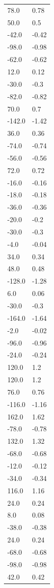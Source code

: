 \begin{longtable}{ll}
78.0 & 0.78 \\
50.0 & 0.5 \\
-42.0 & -0.42 \\
-98.0 & -0.98 \\
-62.0 & -0.62 \\
12.0 & 0.12 \\
-30.0 & -0.3 \\
-82.0 & -0.82 \\
70.0 & 0.7 \\
-142.0 & -1.42 \\
36.0 & 0.36 \\
-74.0 & -0.74 \\
-56.0 & -0.56 \\
72.0 & 0.72 \\
-16.0 & -0.16 \\
-18.0 & -0.18 \\
-36.0 & -0.36 \\
-20.0 & -0.2 \\
-30.0 & -0.3 \\
-4.0 & -0.04 \\
34.0 & 0.34 \\
48.0 & 0.48 \\
-128.0 & -1.28 \\
6.0 & 0.06 \\
-30.0 & -0.3 \\
-164.0 & -1.64 \\
-2.0 & -0.02 \\
-96.0 & -0.96 \\
-24.0 & -0.24 \\
120.0 & 1.2 \\
120.0 & 1.2 \\
76.0 & 0.76 \\
-116.0 & -1.16 \\
162.0 & 1.62 \\
-78.0 & -0.78 \\
132.0 & 1.32 \\
-68.0 & -0.68 \\
-12.0 & -0.12 \\
-34.0 & -0.34 \\
116.0 & 1.16 \\
24.0 & 0.24 \\
8.0 & 0.08 \\
-38.0 & -0.38 \\
24.0 & 0.24 \\
-68.0 & -0.68 \\
-98.0 & -0.98 \\
42.0 & 0.42 \\

\end{longtable}
